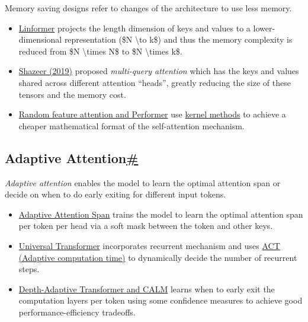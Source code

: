 Memory saving designs refer to changes of the architecture to use less memory.

\begin{itemize}
\tightlist
\item
  \href{https://lilianweng.github.io/posts/2023-01-27-the-transformer-family-v2/\#low-rank-attention}{Linformer} projects the length dimension of keys and values to a lower-dimensional representation (\$N \textbackslash to k\$) and thus the memory complexity is reduced from \$N \textbackslash times N\$ to \$N \textbackslash times k\$.
\item
  \href{https://arxiv.org/abs/1911.02150}{Shazeer (2019)} proposed \emph{multi-query attention} which has the keys and values shared across different attention ``heads'', greatly reducing the size of these tensors and the memory cost.
\item
  \href{https://lilianweng.github.io/posts/2023-01-27-the-transformer-family-v2/\#low-rank-attention}{Random feature attention and Performer} use \href{(https://lilianweng.github.io/posts/2022-09-08-ntk/\#kernel--kernel-methods)}{kernel methods} to achieve a cheaper mathematical format of the self-attention mechanism.
\end{itemize}

\subsection{\texorpdfstring{Adaptive Attention\hyperref[adaptive-attention]{\#}}{Adaptive Attention\#}}\label{adaptive-attention}

\emph{Adaptive attention} enables the model to learn the optimal attention span or decide on when to do early exiting for different input tokens.

\begin{itemize}
\tightlist
\item
  \href{https://lilianweng.github.io/posts/2023-01-27-the-transformer-family-v2/\#adaptive-attention-span}{Adaptive Attention Span} trains the model to learn the optimal attention span per token per head via a soft mask between the token and other keys.
\item
  \href{https://lilianweng.github.io/posts/2023-01-27-the-transformer-family-v2/\#make-it-recurrent}{Universal Transformer} incorporates recurrent mechanism and uses \href{https://lilianweng.github.io/posts/2020-04-07-the-transformer-family/\#adaptive-computation-time-act}{ACT (Adaptive computation time)} to dynamically decide the number of recurrent steps.
\item
  \href{https://lilianweng.github.io/posts/2023-01-27-the-transformer-family-v2/\#depth-adaptive-transformer}{Depth-Adaptive Transformer and CALM} learns when to early exit the computation layers per token using some confidence measures to achieve good performance-efficiency tradeoffs.
\end{itemize}

